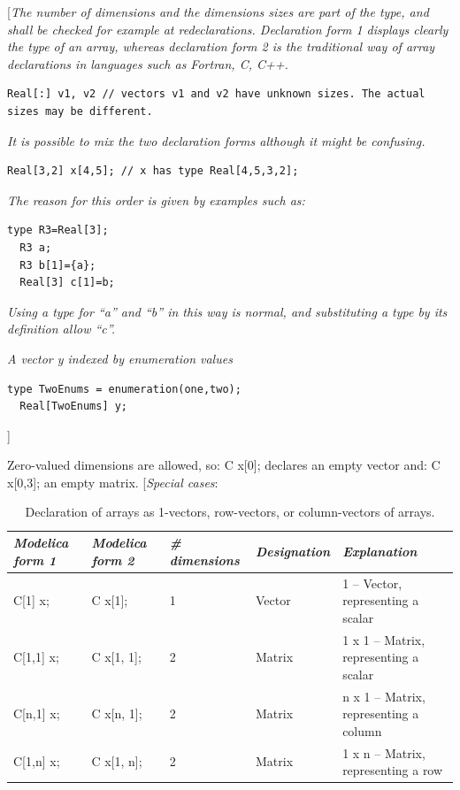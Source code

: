 \documentclass[10pt,a4paper]{report}
\begin{document}
{[}\emph{The number of dimensions and the dimensions sizes are part of
the type, and shall be checked for example at redeclarations.
Declaration form 1 displays clearly the type of an array, whereas
declaration form 2 is the traditional way of array declarations in
languages such as Fortran, C, C++.}

\begin{lstlisting}[language=modelica]
  Real[:] v1, v2 // vectors v1 and v2 have unknown sizes. The actual sizes may be different.
\end{lstlisting}

\emph{It is possible to mix the two declaration forms although it might
be confusing.}

\begin{lstlisting}[language=modelica]
  Real[3,2] x[4,5]; // x has type Real[4,5,3,2];
\end{lstlisting}
\emph{The reason for this order is given by examples such as:}

\begin{lstlisting}[language=modelica]
  type R3=Real[3];
  R3 a;
  R3 b[1]={a};
  Real[3] c[1]=b;
\end{lstlisting}
\emph{Using a type for ``a'' and ``b'' in this way is normal, and
substituting a type by its definition allow ``c''.}

\emph{A vector y indexed by enumeration values}

\begin{lstlisting}[language=modelica]
  type TwoEnums = enumeration(one,two);
  Real[TwoEnums] y;
\end{lstlisting}
{]}

Zero-valued dimensions are allowed, so: C x{[}0{]}; declares an empty
  vector and: C x{[}0,3{]}; an empty matrix.
{[}\emph{Special cases}:

\begin{longtable}{|l|l|l|l|p{3cm}|}
\caption{Declaration of arrays as 1-vectors, row-vectors, or
column-vectors of arrays.}\\
\hline
\emph{Modelica form 1} & \emph{Modelica form 2} & \emph{\# dimensions} &
\emph{Designation} & \emph{Explanation}\\ \hline
\endhead
C{[}1{]} x; & C x{[}1{]};  & 1 & Vector & 1 -- Vector, representing a scalar\\ \hline
C{[}1,1{]} x; & C x{[}1, 1{]}; & 2 & Matrix & 1 x 1 -- Matrix, representing a scalar\\ \hline
C{[}n,1{]} x; & C x{[}n, 1{]}; & 2 & Matrix & n x 1 -- Matrix, representing a column\\ \hline
C{[}1,n{]} x; & C x{[}1, n{]}; & 2 & Matrix & 1 x n -- Matrix, representing a row\\ \hline
\end{longtable}
\end{document}
